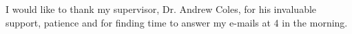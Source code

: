 I would like to thank my supervisor, Dr. Andrew Coles, for his invaluable support, patience and for finding time to answer my e-mails at 4 in the morning.